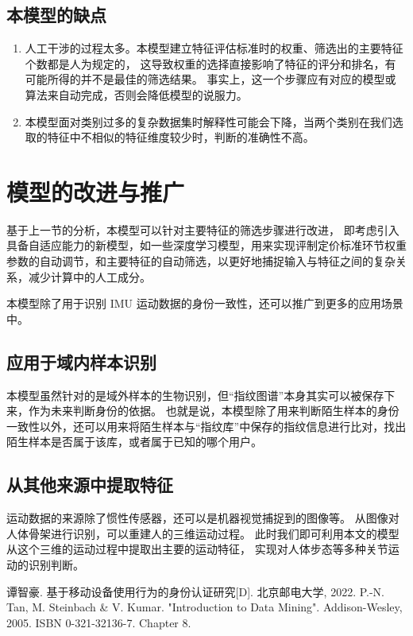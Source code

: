 \documentclass[withoutpreface]{cumcmthesis}
\begin{document}
\subsection{本模型的缺点}

\begin{enumerate}
    \item 人工干涉的过程太多。本模型建立特征评估标准时的权重、筛选出的主要特征个数都是人为规定的，
    这导致权重的选择直接影响了特征的评分和排名，有可能所得的并不是最佳的筛选结果。
    事实上，这一个步骤应有对应的模型或算法来自动完成，否则会降低模型的说服力。
    \item 本模型面对类别过多的复杂数据集时解释性可能会下降，当两个类别在我们选取的特征中不相似的特征维度较少时，判断的准确性不高。
\end{enumerate}

\section{模型的改进与推广}

基于上一节的分析，本模型可以针对主要特征的筛选步骤进行改进，
即考虑引入具备自适应能力的新模型，如一些深度学习模型，用来实现评制定价标准环节权重参数的自动调节，和主要特征的自动筛选，以更好地捕捉输入与特征之间的复杂关系，减少计算中的人工成分。

\bigskip

本模型除了用于识别 IMU 运动数据的身份一致性，还可以推广到更多的应用场景中。

\subsection{应用于域内样本识别}
本模型虽然针对的是域外样本的生物识别，但“指纹图谱”本身其实可以被保存下来，作为未来判断身份的依据。
也就是说，本模型除了用来判断陌生样本的身份一致性以外，还可以用来将陌生样本与“指纹库”中保存的指纹信息进行比对，找出陌生样本是否属于该库，或者属于已知的哪个用户。

\subsection{从其他来源中提取特征}
运动数据的来源除了惯性传感器，还可以是机器视觉捕捉到的图像等。
从图像对人体骨架进行识别，可以重建人的三维运动过程。
此时我们即可利用本文的模型从这个三维的运动过程中提取出主要的运动特征，
实现对人体步态等多种关节运动的识别判断。

\begin{thebibliography}{9} %
    谭智豪.
    \newblock 基于移动设备使用行为的身份认证研究[D].
    \newblock 北京邮电大学, 2022.
    P.-N. Tan, M. Steinbach \& V. Kumar.
    \newblock "Introduction to Data Mining".
    \newblock Addison-Wesley, 2005.
    \newblock ISBN 0-321-32136-7.
    \newblock Chapter 8.
\end{thebibliography}
\end{document}
